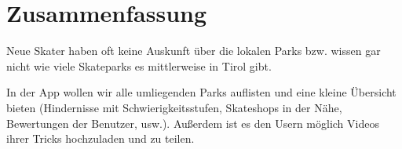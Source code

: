 \section*{Zusammenfassung}

Neue Skater haben oft keine Auskunft über die lokalen Parks bzw. wissen gar nicht wie viele
Skateparks es mittlerweise in Tirol gibt.

In der App wollen wir alle umliegenden Parks auflisten und eine kleine
Übersicht bieten (Hindernisse mit Schwierigkeitsstufen, Skateshops in der Nähe, Bewertungen der
Benutzer, usw.). Außerdem ist es den Usern möglich Videos ihrer Tricks hochzuladen und zu teilen.

\newpage